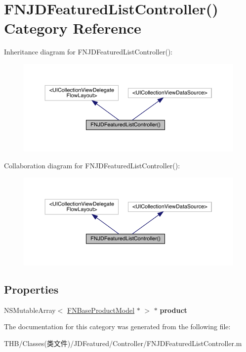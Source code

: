 \hypertarget{category_f_n_j_d_featured_list_controller_07_08}{}\section{F\+N\+J\+D\+Featured\+List\+Controller() Category Reference}
\label{category_f_n_j_d_featured_list_controller_07_08}


Inheritance diagram for F\+N\+J\+D\+Featured\+List\+Controller()\+:\nopagebreak
\begin{figure}[H]
\begin{center}
\leavevmode
\includegraphics[width=350pt]{category_f_n_j_d_featured_list_controller_07_08__inherit__graph}
\end{center}
\end{figure}


Collaboration diagram for F\+N\+J\+D\+Featured\+List\+Controller()\+:\nopagebreak
\begin{figure}[H]
\begin{center}
\leavevmode
\includegraphics[width=350pt]{category_f_n_j_d_featured_list_controller_07_08__coll__graph}
\end{center}
\end{figure}
\subsection*{Properties}
\begin{DoxyCompactItemize}
\item 
\mbox{\label{category_f_n_j_d_featured_list_controller_07_08_ae68e4e3d1a59a890c44b4f3f5826211b}} 
N\+S\+Mutable\+Array$<$ \mbox{\hyperlink{interface_f_n_base_product_model}{F\+N\+Base\+Product\+Model}} $\ast$ $>$ $\ast$ {\bfseries product}
\end{DoxyCompactItemize}


The documentation for this category was generated from the following file\+:\begin{DoxyCompactItemize}
\item 
T\+H\+B/\+Classes(类文件)/\+J\+D\+Featured/\+Controller/F\+N\+J\+D\+Featured\+List\+Controller.\+m\end{DoxyCompactItemize}
